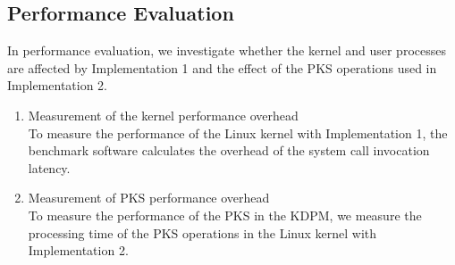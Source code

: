 \subsection{Performance Evaluation}



In performance evaluation, we investigate whether the kernel and user processes
are affected by Implementation 1 and the effect of the PKS operations used in
Implementation 2.


\begin{enumerate}[topsep=0pt]%

\item Measurement of the kernel performance overhead\\
To measure the performance of the Linux kernel with Implementation 1, the benchmark
software calculates the overhead of the system call invocation latency.

\item Measurement of PKS performance overhead\\
To measure the performance of the PKS in the KDPM, we measure the processing
time of the PKS operations in the Linux kernel with Implementation 2.
    
\end{enumerate}
  

